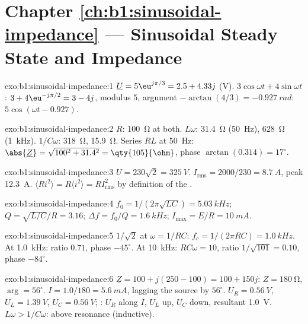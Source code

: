 \section*{Chapter \ref{ch:b1:sinusoidal-impedance} --- Sinusoidal Steady State and Impedance}

\begin{solution}{exo:b1:sinusoidal-impedance:1}
$\underline U = 5\eu^{j\pi/3} = 2.5 + 4.33j$ (V). $3\cos\omega t +
4\sin\omega t$: $3 + 4\eu^{-j\pi/2} = 3 - 4j$, modulus $5$, argument
$-\arctan(4/3) = \qty{-0.927}{rad}$: $5\cos(\omega t - 0.927)$.
\end{solution}

\begin{solution}{exo:b1:sinusoidal-impedance:2}
$R$: \qty{100}{\ohm} at both. $L\omega$: \qty{31.4}{\ohm} (\qty{50}{Hz}),
\qty{628}{\ohm} (\qty{1}{kHz}). $1/C\omega$: \qty{318}{\ohm}, \qty{15.9}{\ohm}.
Series $RL$ at \qty{50}{Hz}: $\abs{\underline Z} = \sqrt{100^2 + 31.4^2} =
\qty{105}{\ohm}$, phase $\arctan(0.314) = 17^\circ$.
\end{solution}

\begin{solution}{exo:b1:sinusoidal-impedance:3}
$U = 230\sqrt2 = \qty{325}{V}$. $I_{\mathrm{rms}} = 2000/230 = \qty{8.7}{A}$,
peak \qty{12.3}{A}. $\langle Ri^2\rangle = R\langle i^2\rangle =
RI_{\mathrm{rms}}^2$ by definition of the .
\end{solution}

\begin{solution}{exo:b1:sinusoidal-impedance:4}
$f_0 = 1/(2\pi\sqrt{LC}) = \qty{5.03}{kHz}$; $Q = \sqrt{L/C}/R = 3.16$;
$\Delta f = f_0/Q = \qty{1.6}{kHz}$; $I_{\max} = E/R = \qty{10}{mA}$.
\end{solution}

\begin{solution}{exo:b1:sinusoidal-impedance:5}
$1/\sqrt2$ at $\omega = 1/RC$: $f_c = 1/(2\pi RC) = \qty{1.0}{kHz}$. At
\qty{1.0}{kHz}: ratio $0.71$, phase $-45^\circ$. At \qty{10}{kHz}:
$RC\omega = 10$, ratio $1/\sqrt{101} = 0.10$, phase $-84^\circ$.
\end{solution}

\begin{solution}{exo:b1:sinusoidal-impedance:6}
$\underline Z = 100 + j(250 - 100) = 100 + 150j$: $Z = \qty{180}{\ohm}$,
$\arg = 56^\circ$. $I = 1.0/180 = \qty{5.6}{mA}$, lagging the source by
$56^\circ$. $U_R = \qty{0.56}{V}$, $U_L = \qty{1.39}{V}$, $U_C = \qty{0.56}{V}$;
: $U_R$ along $I$, $U_L$ up, $U_C$ down, resultant \qty{1.0}{V}.
$L\omega > 1/C\omega$: above resonance (inductive).
\end{solution}

